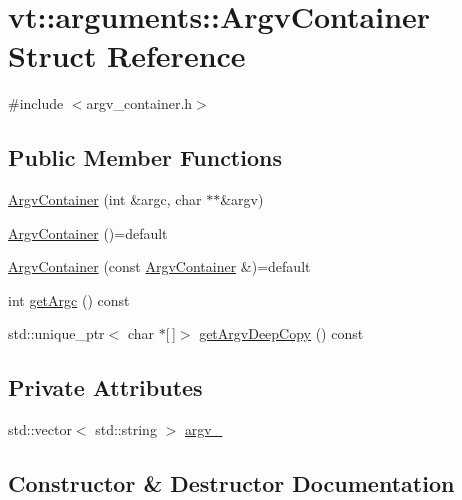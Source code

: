 \hypertarget{structvt_1_1arguments_1_1_argv_container}{}\section{vt\+:\+:arguments\+:\+:Argv\+Container Struct Reference}
\label{structvt_1_1arguments_1_1_argv_container}


{\ttfamily \#include $<$argv\+\_\+container.\+h$>$}

\subsection*{Public Member Functions}
\begin{DoxyCompactItemize}
\item 
\hyperlink{structvt_1_1arguments_1_1_argv_container_a2b5fa0c013fbb18c69af03fc66d33137}{Argv\+Container} (int \&argc, char $\ast$$\ast$\&argv)
\item 
\hyperlink{structvt_1_1arguments_1_1_argv_container_acf2a701ba1a47663f0cbceac3bb5604a}{Argv\+Container} ()=default
\item 
\hyperlink{structvt_1_1arguments_1_1_argv_container_ae9fb7861228e9b3ee0517fc2cee56047}{Argv\+Container} (const \hyperlink{structvt_1_1arguments_1_1_argv_container}{Argv\+Container} \&)=default
\item 
int \hyperlink{structvt_1_1arguments_1_1_argv_container_a741005e9bbefdae1a262fa5f57823fe3}{get\+Argc} () const
\item 
std\+::unique\+\_\+ptr$<$ char $\ast$\mbox{[}$\,$\mbox{]}$>$ \hyperlink{structvt_1_1arguments_1_1_argv_container_adba844ca29a9f5663324dd78e5211d24}{get\+Argv\+Deep\+Copy} () const
\end{DoxyCompactItemize}
\subsection*{Private Attributes}
\begin{DoxyCompactItemize}
\item 
std\+::vector$<$ std\+::string $>$ \hyperlink{structvt_1_1arguments_1_1_argv_container_a1022e723efd050d0908216b1fdb5a92b}{argv\+\_\+}
\end{DoxyCompactItemize}


\subsection{Constructor \& Destructor Documentation}
\mbox{\label{structvt_1_1arguments_1_1_argv_container_a2b5fa0c013fbb18c69af03fc66d33137}} 
